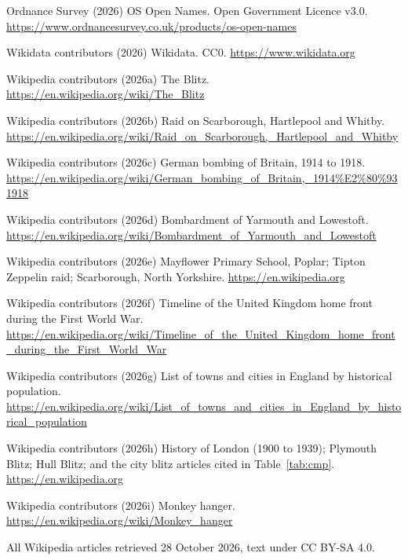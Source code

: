 \documentclass[11pt,a4paper]{article}
\begin{document}
Ordnance Survey (2026) OS Open Names. Open Government Licence v3.0. \url{https://www.ordnancesurvey.co.uk/products/os-open-names}

Wikidata contributors (2026) Wikidata. CC0. \url{https://www.wikidata.org}

Wikipedia contributors (2026a) The Blitz. \url{https://en.wikipedia.org/wiki/The_Blitz}

Wikipedia contributors (2026b) Raid on Scarborough, Hartlepool and Whitby. \url{https://en.wikipedia.org/wiki/Raid_on_Scarborough,_Hartlepool_and_Whitby}

Wikipedia contributors (2026c) German bombing of Britain, 1914 to 1918. \url{https://en.wikipedia.org/wiki/German_bombing_of_Britain,_1914\%E2\%80\%931918}

Wikipedia contributors (2026d) Bombardment of Yarmouth and Lowestoft. \url{https://en.wikipedia.org/wiki/Bombardment_of_Yarmouth_and_Lowestoft}

Wikipedia contributors (2026e) Mayflower Primary School, Poplar; Tipton Zeppelin raid; Scarborough, North Yorkshire. \url{https://en.wikipedia.org}

Wikipedia contributors (2026f) Timeline of the United Kingdom home front during the First World War. \url{https://en.wikipedia.org/wiki/Timeline_of_the_United_Kingdom_home_front_during_the_First_World_War}

Wikipedia contributors (2026g) List of towns and cities in England by historical population. \url{https://en.wikipedia.org/wiki/List_of_towns_and_cities_in_England_by_historical_population}

Wikipedia contributors (2026h) History of London (1900 to 1939); Plymouth Blitz; Hull Blitz; and the city blitz articles cited in Table~\ref{tab:cmp}. \url{https://en.wikipedia.org}

Wikipedia contributors (2026i) Monkey hanger. \url{https://en.wikipedia.org/wiki/Monkey_hanger}

All Wikipedia articles retrieved 28 October 2026, text under CC BY-SA 4.0.
\end{document}
